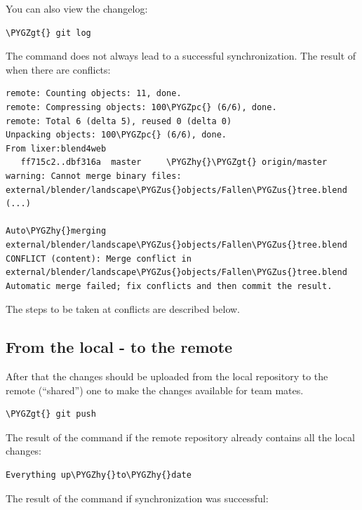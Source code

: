 \documentclass[a4paper,12pt,oneside]{sphinxmanual}
\def\PYGZus{\char`\_}
\def\PYGZgt{\char`\>}
\def\PYGZpc{\char`\%}
\def\PYGZhy{\char`\-}
\begin{document}
You can also view the changelog:

\begin{Verbatim}[commandchars=\\\{\}]
\PYGZgt{} git log
\end{Verbatim}

The  command does not always lead to a successful synchronization. The result of  when there are conflicts:

\begin{Verbatim}[commandchars=\\\{\}]
remote: Counting objects: 11, done.
remote: Compressing objects: 100\PYGZpc{} (6/6), done.
remote: Total 6 (delta 5), reused 0 (delta 0)
Unpacking objects: 100\PYGZpc{} (6/6), done.
From lixer:blend4web
   ff715c2..dbf316a  master     \PYGZhy{}\PYGZgt{} origin/master
warning: Cannot merge binary files: external/blender/landscape\PYGZus{}objects/Fallen\PYGZus{}tree.blend (...)

Auto\PYGZhy{}merging external/blender/landscape\PYGZus{}objects/Fallen\PYGZus{}tree.blend
CONFLICT (content): Merge conflict in external/blender/landscape\PYGZus{}objects/Fallen\PYGZus{}tree.blend
Automatic merge failed; fix conflicts and then commit the result.
\end{Verbatim}

The steps to be taken at conflicts are described below.


\subsection{From the local - to the remote}
\label{git_short_manual:id15}
After that the changes should be uploaded from the local repository to the remote (``shared'') one to make the changes available for team mates.

\begin{Verbatim}[commandchars=\\\{\}]
\PYGZgt{} git push
\end{Verbatim}

The result of the  command if the remote repository already contains all the local changes:

\begin{Verbatim}[commandchars=\\\{\}]
Everything up\PYGZhy{}to\PYGZhy{}date
\end{Verbatim}

The result of the  command if synchronization was successful:
\end{document}
